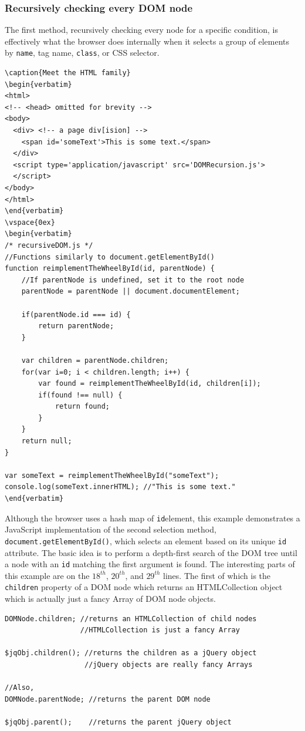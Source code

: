 \documentclass[12pt]{article}
\begin{document}
\subsubsection*{Recursively checking every DOM node}
The first method, recursively checking every node for a specific condition, is effectively what the browser does internally when it selects a group of elements by \texttt{name}, tag name, \texttt{class}, or CSS selector. 
\begin{lstlisting}
\caption{Meet the HTML family}
\begin{verbatim}
<html>
<!-- <head> omitted for brevity -->
<body>
  <div> <!-- a page div[ision] -->
    <span id='someText'>This is some text.</span>
  </div>
  <script type='application/javascript' src='DOMRecursion.js'>
  </script>
</body>
</html>
\end{verbatim}
\vspace{0ex}
\begin{verbatim}
/* recursiveDOM.js */
//Functions similarly to document.getElementById()
function reimplementTheWheelById(id, parentNode) {
    //If parentNode is undefined, set it to the root node
    parentNode = parentNode || document.documentElement;

    if(parentNode.id === id) {
        return parentNode;
    }

    var children = parentNode.children;
    for(var i=0; i < children.length; i++) {
        var found = reimplementTheWheelById(id, children[i]);
        if(found !== null) {
            return found;
        }
    }
    return null;
}

var someText = reimplementTheWheelById("someText");
console.log(someText.innerHTML); //"This is some text."
\end{verbatim}
\end{lstlisting}
Although the browser uses a hash map of \texttt{id}\textrightarrow element, this example demonstrates a JavaScript implementation of the second selection method, \texttt{document.getElementById()}, which selects an element based on its unique \texttt{id} attribute. The basic idea is to perform a depth-first search of the DOM tree until a node with an \texttt{id} matching the first argument is found. The interesting parts of this example are on the $18^{th}$, $20^{th}$, and $29^{th}$ lines. The first of which is the \texttt{children} property of a DOM node which returns an HTMLCollection object which is actually just a fancy Array of DOM node objects.
\begin{Verbatim}[frame=single]
DOMNode.children; //returns an HTMLCollection of child nodes
                  //HTMLCollection is just a fancy Array

$jqObj.children(); //returns the children as a jQuery object
                   //jQuery objects are really fancy Arrays

//Also,
DOMNode.parentNode; //returns the parent DOM node

$jqObj.parent();    //returns the parent jQuery object
\end{Verbatim}
\end{document}
